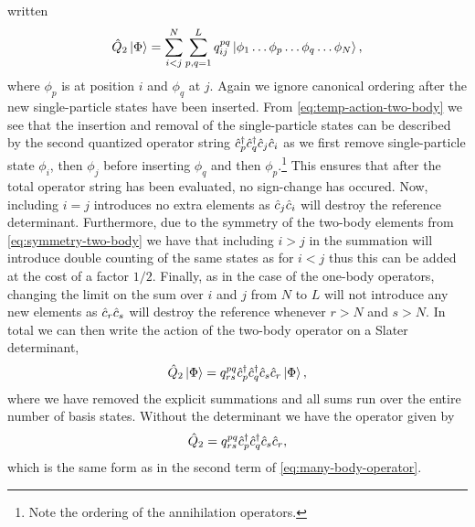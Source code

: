         written
        \begin{align}
            \hat{Q}_2\ket*{\Phi}
            = \sum_{i < j}^{N}\sum_{p, q = 1}^{L}
            q^{pq}_{ij}\ket*{\phi_1\dots\phi_p\dots\phi_q\dots\phi_N},
            \label{eq:temp-action-two-body}
        \end{align}
        where $\phi_p$ is at position $i$ and $\phi_q$ at $j$.
        Again we ignore canonical ordering after the new single-particle states
        have been inserted.
        From \autoref{eq:temp-action-two-body} we see that the insertion and
        removal of the single-particle states can be described by the second
        quantized operator string $\hat{c}_{p}^{\dagger}\hat{c}_{q}^{\dagger}\hat{c}_{j}\hat{c}_{i}$ as we first
        remove single-particle state $\phi_i$, then $\phi_j$ before inserting
        $\phi_q$ and then $\phi_p$.\footnote{%
            Note the ordering of the annihilation operators.
        }
        This ensures that after the total operator string has been evaluated, no
        sign-change has occured.
        Now, including $i = j$ introduces no extra elements as $\hat{c}_{j}\hat{c}_{i}$
        will destroy the reference determinant.
        Furthermore, due to the symmetry of the two-body elements from
        \autoref{eq:symmetry-two-body} we have that including $i > j$ in the
        summation will introduce double counting of the same states as for $i <
        j$ thus this can be added at the cost of a factor $1/2$.
        Finally, as in the case of the one-body operators, changing the limit on
        the sum over $i$ and $j$ from $N$ to $L$ will not introduce any new
        elements as $\hat{c}_{r}\hat{c}_{s}$ will destroy the reference whenever $r > N$
        and $s > N$.
        In total we can then write the action of the two-body operator on a
        Slater determinant,
        \begin{align}
            \hat{Q}_2\ket*{\Phi}
            = q^{pq}_{rs} \hat{c}_{p}^{\dagger}\hat{c}_{q}^{\dagger}\hat{c}_{s}\hat{c}_{r}\ket*{\Phi},
        \end{align}
        where we have removed the explicit summations and all sums run over the
        entire number of basis states.
        Without the determinant we have the operator given by
        \begin{align}
            \hat{Q}_2
            = q^{pq}_{rs}\hat{c}_{p}^{\dagger}\hat{c}_{q}^{\dagger}\hat{c}_{s}\hat{c}_{r},
        \end{align}
        which is the same form as in the second term of
        \autoref{eq:many-body-operator}.

